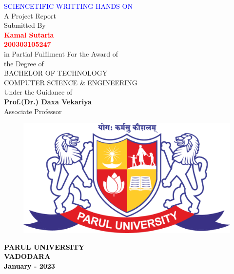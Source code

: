 \thispagestyle{empty}
\begin{center}
\textcolor{blue}{{\huge \textsc{SCIENCETIFIC WRITTING HANDS ON} }}\\
\vspace{1cm}
A Project Report \\
\vspace{0.3cm}
Submitted By\\

\textcolor{red}{{\huge \bf Kamal Sutaria}\\ 
{\bf 200303105247}}\\ 

\vspace{0.4cm}
in Partial Fulfilment For the Award of\\
the Degree of\\
BACHELOR OF TECHNOLOGY\\
COMPUTER SCIENCE \& ENGINEERING\\
Under the Guidance of\\
\large{\textbf{Prof.(Dr.) Daxa Vekariya}}\\
Associate Professor\\

\vspace{0.3cm}
\begin{figure}[h]
\begin{center}
     \includegraphics[scale=0.1]{parullogo.png}
\end{center}
\end{figure}
\textcolor{black}{\textbf{\large{PARUL UNIVERSITY}\\
VADODARA\\
January - 2023}}
\end{center}
